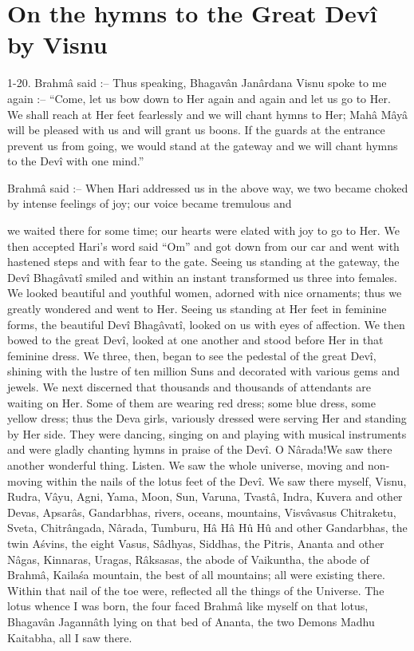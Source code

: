﻿\chapter{On the hymns to the Great Dev\^i by Visnu}

1-20. Brahm\^a said :-- Thus speaking, Bhagav\^an Jan\^ardana Visnu spoke to me again :-- ``Come, let us bow down to Her again and again and let us go to Her. We shall reach at Her feet fearlessly and we will chant hymns to Her; Mah\^a M\^ay\^a will be pleased with us and will grant us boons. If the guards at the entrance prevent us from going, we would stand at the gateway and we will chant hymns to the Dev\^i with one mind.''

Brahm\^a said :-- When Hari addressed us in the above way, we two became choked by intense feelings of joy; our voice became tremulous and

we waited there for some time; our hearts were elated with joy to go to Her. We then accepted Hari's word said ``Om'' and got down from our car and went with hastened steps and with fear to the gate. Seeing us standing at the gateway, the Dev\^i Bhag\^avat\^i smiled and within an instant transformed us three into females. We looked beautiful and youthful women, adorned with nice ornaments; thus we greatly wondered and went to Her. Seeing us standing at Her feet in feminine forms, the beautiful Dev\^i Bhag\^avat\^i, looked on us with eyes of affection. We then bowed to the great Dev\^i, looked at one another and stood before Her in that feminine dress. We three, then, began to see the pedestal of the great Dev\^i, shining with the lustre of ten million Suns and decorated with various gems and jewels. We next discerned that thousands and thousands of attendants are waiting on Her. Some of them are wearing red dress; some blue dress, some yellow dress; thus the Deva girls, variously dressed were serving Her and standing by Her side. They were dancing, singing on and playing with musical instruments and were gladly chanting hymns in praise of the Dev\^i. O N\^arada!We saw there another wonderful thing. Listen. We saw the whole universe, moving and non-moving within the nails of the lotus feet of the Dev\^i. We saw there myself, Visnu, Rudra, V\^ayu, Agni, Yama, Moon, Sun, Varuna, Tvast\^a, Indra, Kuvera and other Devas, Apsar\^as, Gandarbhas, rivers, oceans, mountains, Visv\^avasus Chitraketu, Sveta, Chitr\^angada, N\^arada, Tumburu, H\^a H\^a Hû Hû and other Gandarbhas, the twin A\'svins, the eight Vasus, S\^adhyas, Siddhas, the Pitris, Ananta and other N\^agas, Kinnaras, Uragas, R\^aksasas, the abode of Vaikuntha, the abode of Brahm\^a, Kaila\'sa mountain, the best of all mountains; all were existing there. Within that nail of the toe were, reflected all the things of the Universe. The lotus whence I was born, the four faced Brahm\^a like myself on that lotus, Bhagav\^an Jagann\^ath lying on that bed of Ananta, the two Demons Madhu Kaitabha, all I saw there.

